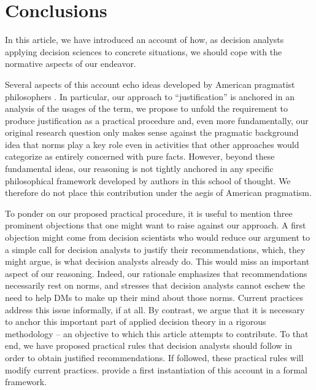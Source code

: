 \documentclass[preprint, french, english, 11pt, authoryear]{elsarticle}%
\begin{document}
\section{Conclusions}
\label{sec:concl}
In this article, we have introduced an account of how, as decision analysts applying decision sciences to concrete situations, we should cope with the normative aspects of our endeavor. %
\begin{changebar}Several aspects of this account echo ideas developed by American pragmatist philosophers \citep{ormerod_history_2006}. 
In particular, our approach to ``justification'' is anchored in an analysis of the usages of the term, we propose to unfold the requirement to produce justification as a practical procedure and, even more fundamentally, 
our original research question only makes sense against the pragmatic background idea that norms play a key role even in activities that other approaches would categorize as entirely concerned with pure facts.
However, beyond these fundamental ideas, our reasoning is not tightly anchored in any specific philosophical framework developed by authors in this school of thought.
We therefore do not place this contribution under the aegis of American pragmatism.
\end{changebar}

To ponder on our proposed practical procedure, it is useful to mention three prominent objections that one might want to raise against our approach. A first objection might come from decision scientists who would reduce our argument to a simple call for decision analysts to justify their recommendations, which, they might argue, is what decision analysts already do. This would miss an important aspect of our reasoning. Indeed, our rationale emphasizes that recommendations necessarily rest on norms, and stresses that decision analysts cannot eschew the need to help \acp{DM} to make up their mind about those norms. Current practices address this issue informally, if at all. By contrast, we argue that it is necessary to anchor this important part of applied decision theory in a rigorous methodology -- an objective to which this article attempts to contribute. To that end, we have proposed practical rules that decision analysts should follow in order to obtain justified recommendations. If followed, these practical rules will modify current practices. \citet{cailloux_formal_2018} provide a first instantiation of this account in a formal framework.
\end{document}
